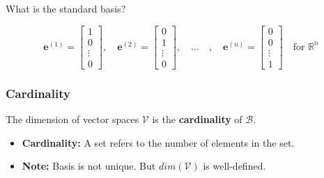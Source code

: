 \documentclass{article}
\begin{document}
        \begin{example}
            What is the standard basis?
            \vspace{1em}

            \[
            \mathbf{e}^{(1)} = \begin{bmatrix}
            1 \\
            0 \\
            \vdots \\
            0
            \end{bmatrix}, \quad
            \mathbf{e}^{(2)} = \begin{bmatrix}
            0 \\
            1 \\
            \vdots \\
            0
            \end{bmatrix}, \quad \dots \quad, \quad
            \mathbf{e}^{(n)} = \begin{bmatrix}
            0 \\
            0 \\
            \vdots \\
            1
            \end{bmatrix}
            \quad \text{for } \mathbb{R}^n
            \]
        \end{example}
    
    \subsubsection{Cardinality}
        \begin{definition}
            The dimension of vector spaces $\mathcal{V}$ is the \textbf{cardinality} of $\mathcal{B}$.
            \begin{itemize}
                \item \textbf{Cardinality:} A set refers to the number of elements in the set.
                \item \textbf{Note:} Basis is not unique. But $dim(\mathcal{V})$ is well-defined.
            \end{itemize}
        \end{definition}
    
\end{document}

